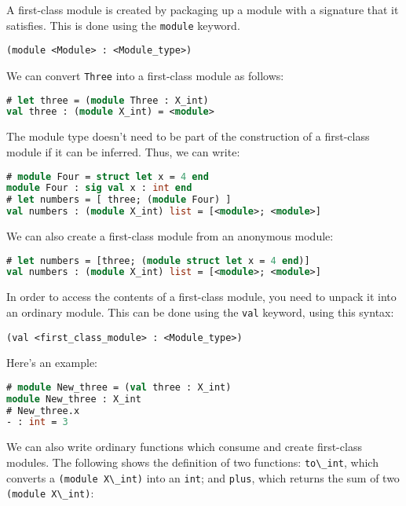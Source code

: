 A first-class module is created by packaging up a module with a
signature that it satisfies. This is done using the
\passthrough{\lstinline!module!} keyword. 

\begin{lstlisting}
(module <Module> : <Module_type>)
\end{lstlisting}

We can convert \passthrough{\lstinline!Three!} into a first-class module
as follows:

\begin{lstlisting}[language=Caml]
# let three = (module Three : X_int)
val three : (module X_int) = <module>
\end{lstlisting}

The module type doesn't need to be part of the construction of a
first-class module if it can be inferred. Thus, we can write:

\begin{lstlisting}[language=Caml]
# module Four = struct let x = 4 end
module Four : sig val x : int end
# let numbers = [ three; (module Four) ]
val numbers : (module X_int) list = [<module>; <module>]
\end{lstlisting}

We can also create a first-class module from an anonymous module:

\begin{lstlisting}[language=Caml]
# let numbers = [three; (module struct let x = 4 end)]
val numbers : (module X_int) list = [<module>; <module>]
\end{lstlisting}

In order to access the contents of a first-class module, you need to
unpack it into an ordinary module. This can be done using the
\passthrough{\lstinline!val!} keyword, using this syntax:

\begin{lstlisting}
(val <first_class_module> : <Module_type>)
\end{lstlisting}

Here's an example:

\begin{lstlisting}[language=Caml]
# module New_three = (val three : X_int)
module New_three : X_int
# New_three.x
- : int = 3
\end{lstlisting}

We can also write ordinary functions which consume and create
first-class modules. The following shows the definition of two
functions: \passthrough{\lstinline!to\_int!}, which converts a
\passthrough{\lstinline!(module X\_int)!} into an
\passthrough{\lstinline!int!}; and \passthrough{\lstinline!plus!}, which
returns the sum of two \passthrough{\lstinline!(module X\_int)!}:

